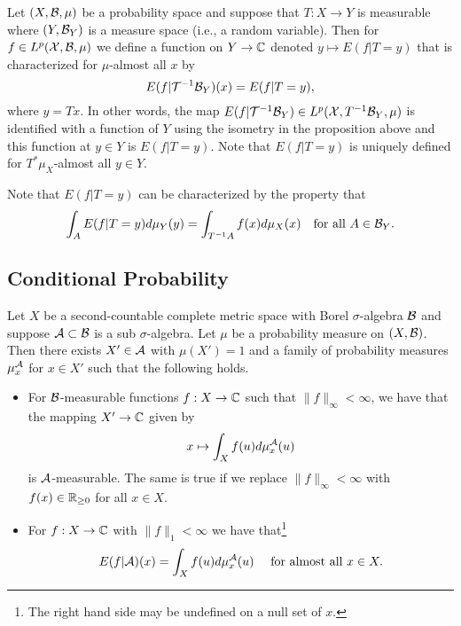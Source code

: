 \documentclass[twoside, a4paper, 10pt]{amsart}
\begin{document}
\begin{mydef} Let $(X, \mathcal{B}, \mu)$ be a probability space and suppose that $T:X \to Y$ is measurable where $(Y, \mathcal{B}_Y)$ is a measure space (i.e., a random variable). Then for $f \in L^p(\mathcal{X},\mathcal{B},\mu)$ we define a function on $Y \to \mathbb{C}$ denoted $y \mapsto E(f| T=y)$ that is characterized for $\mu$-almost all $x$ by  $$E(f|\mathcal{T}^{-1}\mathcal{B}_Y)(x) = E(f| T=y),$$ where $y = Tx$. In other words, the map $E(f|\mathcal{T}^{-1}\mathcal{B}_Y) \in L^p(\mathcal{X},T^{-1}\mathcal{B}_Y,\mu)$ is identified with a function of $Y$ using the isometry in the proposition above and this function at $y \in Y$ is  $E(f| T=y)$. Note that $E(f|T=y)$ is uniquely defined for $T^*\mu_X$-almost all $y \in Y$.

\end{mydef}

Note that $E(f|T=y)$ can be characterized by the property that $$\int_A E(f|T=y) d\mu_Y(y) = \int_{T^{-1}A} f(x) d\mu_X(x) \quad \text{for all } A \in \mathcal{B}_Y.$$ 

\subsection{Conditional Probability}

\begin{thm} Let $X$ be a second-countable complete metric space with Borel $\sigma$-algebra $\mathcal{B}$ and suppose $\mathcal{A} \subset \mathcal{B}$ is a sub $\sigma$-algebra. Let $\mu$ be a probability measure on $(X,\mathcal{B})$. Then there exists $X' \in \mathcal{A}$ with $\mu(X')=1$ and a family of probability measures $\mu_x^{\mathcal{A}}$ for $x \in X'$ such that the following holds.

\begin{itemize}
	\item For $\mathcal{B}$-measurable functions $f:X \to \mathbb{C}$ such that $\|f\|_{\infty} < \infty$, we have that the mapping $X' \to \mathbb{C}$ given by $$x \mapsto \int_X f(u) d\mu_x^{\mathcal{A}} (u)$$ is $\mathcal{A}$-measurable. The same is true if we replace $\|f\|_{\infty} < \infty$ with $f(x) \in \mathbb{R}_{\geq 0}$ for all $x \in X$.
	\item For $f: X \to \mathbb{C}$ with $\|f\|_1 < \infty$ we have that\footnote{The right hand side may be undefined on a null set of $x$.}  $$E(f|\mathcal{A})(x) = \int_X f(u) d\mu_x^{\mathcal{A}} (u) \quad \text{ for almost all } x \in X.$$

\end{itemize}

\end{thm}
\end{document}
